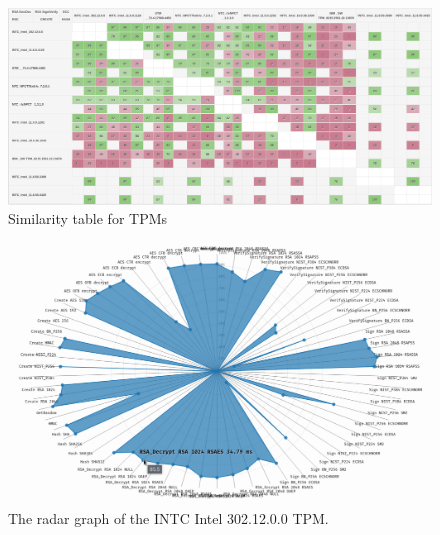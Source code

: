 \begin{landscape}
    \begin{figure}[!t]
        \includegraphics[width=\linewidth, height=\textwidth]{img/visualizations/tpm-similarity.png}
        \caption{Similarity table for TPMs}
    \end{figure}
\end{landscape}

\begin{landscape}
\begin{figure}[!t]
    \centering
    \includegraphics[width=\linewidth]{img/visualizations/INTC_Intel_302.12.0.0 radar graph.png}
    \caption{
    The radar graph of the INTC Intel 302.12.0.0 TPM.
    }
\end{figure}
\end{landscape}

